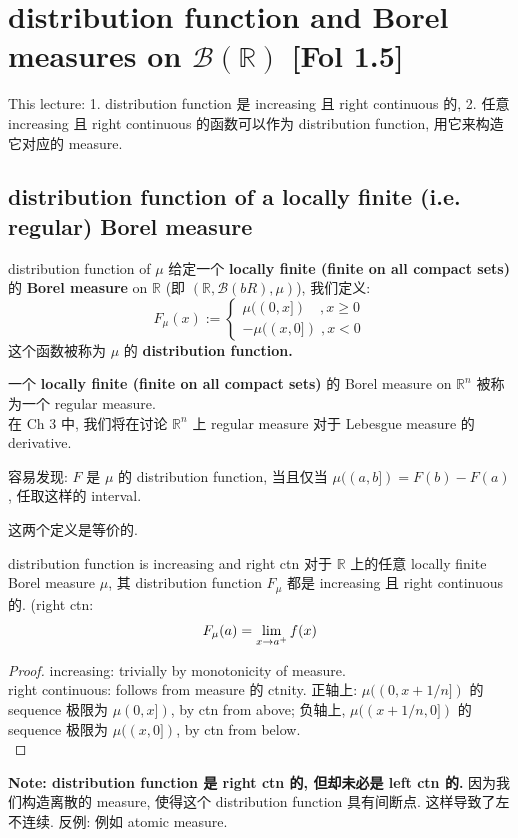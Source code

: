 \documentclass[lang=cn,11pt]{elegantbook}
\begin{document}
\chapter{distribution function and Borel measures on $\mathcal{B}(\mathbb{R})$ [Fol 1.5]}
This lecture: 
1. distribution function 是 increasing 且 right continuous 的, 
2. 任意 increasing 且 right continuous 的函数可以作为 distribution function, 用它来构造它对应的 measure.


\section{distribution function of a locally finite (i.e. regular) Borel measure}
\begin{definition}{distribution function of $\mu$}
给定一个 \textbf{locally finite (finite on all compact sets)} 的 \textbf{Borel measure} on $\mathbb{R}$ (即 $(\mathbb{R}, \mathcal{B}(bR), \mu)$), 我们定义:
$$
F_\mu(x ) := \begin{cases}
    \mu((0,x]) \quad  , x \geq 0 \\
     -\mu((x,0]) \; , x < 0
\end{cases}
$$
这个函数被称为 $\mu$ 的 \textbf{distribution function.}
\end{definition}
\begin{remark}
一个 \textbf{locally finite (finite on all compact sets)} 的 Borel measure on $\mathbb{R}^n$ 被称为一个 regular measure.\\
 在 Ch 3 中, 我们将在讨论 $\mathbb{R}^n$ 上 regular measure 对于 Lebesgue measure 的 derivative.
\end{remark}
\begin{proposition}
        容易发现: $F$ 是 $\mu$ 的 distribution function, 当且仅当 $\mu((a,b]) = F(b) - F(a)$, 任取这样的 interval.
\end{proposition}
这两个定义是等价的. 



\begin{theorem}{distribution function is increasing and right ctn}
对于 $\mathbb{R}$ 上的任意 locally finite Borel measure $\mu$, 其 distribution function $F_\mu$ 都是 increasing 且 right continuous 的.
(right ctn:$$F_\mu(a) = \lim_{x\rightarrow a^+} f(x)$$
\end{theorem}
\begin{proof}
    increasing: trivially by monotonicity of measure.\\
    right continuous: follows from measure 的 ctnity. 正轴上: $\mu((0,x+ 1/n])$ 的 sequence 极限为 $\mu(0,x])$, by ctn from above; 负轴上, $\mu((x+ 1/n,0])$ 的 sequence 极限为 $\mu((x,0])$, by ctn from below.\\
\end{proof}
\begin{remark}
   \textbf{ Note: distribution function 是 right ctn 的, 但却未必是 left ctn 的.}
   因为我们构造离散的 measure, 使得这个 distribution function 具有间断点. 这样导致了左不连续.
   反例: 例如 atomic measure. 
\end{remark}
\end{document}
